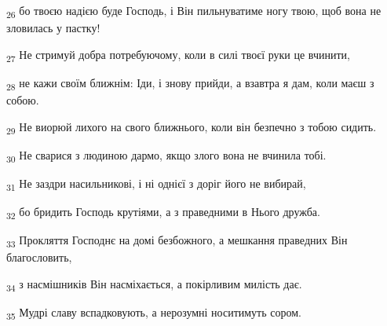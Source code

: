 \begin{tcolorbox}
\textsubscript{26} бо твоєю надією буде Господь, і Він пильнуватиме ногу твою, щоб вона не зловилась у пастку!
\end{tcolorbox}
\begin{tcolorbox}
\textsubscript{27} Не стримуй добра потребуючому, коли в силі твоєї руки це вчинити,
\end{tcolorbox}
\begin{tcolorbox}
\textsubscript{28} не кажи своїм ближнім: Іди, і знову прийди, а взавтра я дам, коли маєш з собою.
\end{tcolorbox}
\begin{tcolorbox}
\textsubscript{29} Не виорюй лихого на свого ближнього, коли він безпечно з тобою сидить.
\end{tcolorbox}
\begin{tcolorbox}
\textsubscript{30} Не сварися з людиною дармо, якщо злого вона не вчинила тобі.
\end{tcolorbox}
\begin{tcolorbox}
\textsubscript{31} Не заздри насильникові, і ні однієї з доріг його не вибирай,
\end{tcolorbox}
\begin{tcolorbox}
\textsubscript{32} бо бридить Господь крутіями, а з праведними в Нього дружба.
\end{tcolorbox}
\begin{tcolorbox}
\textsubscript{33} Прокляття Господнє на домі безбожного, а мешкання праведних Він благословить,
\end{tcolorbox}
\begin{tcolorbox}
\textsubscript{34} з насмішників Він насміхається, а покірливим милість дає.
\end{tcolorbox}
\begin{tcolorbox}
\textsubscript{35} Мудрі славу вспадковують, а нерозумні носитимуть сором.
\end{tcolorbox}
